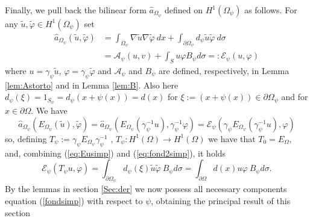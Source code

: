 \documentclass[a4paper,reqno,11pt,oneside]{amsart}
\theoremstyle{plain}
\theoremstyle{plain}
\theoremstyle{plain}
\theoremstyle{remark}
\begin{document}
Finally, we pull back the bilinear form $\hat a_{\Omega_\psi} $ defined  on $H^1 (\Omega_\psi)$ as follows. For any $\tilde u,\tilde \varphi\in H^1 (\Omega_\psi)$ set
$$
\begin{aligned}
    \hat a_{\Omega_\psi}(\tilde u,\tilde \varphi)&=
   \int_{ \Omega_\psi}\nabla \tilde u\nabla\tilde \varphi\  dx
    +\int_{\partial \Omega_\psi}d_\psi \tilde u\tilde \varphi\ d\sigma 
    \\ &
    =\mathcal{A}_\psi (u,v)
    +\int_{S} u \varphi B_\psi d\sigma =:\mathcal{E}_\psi (u,\varphi) 
\end{aligned}$$
 where $u=\gamma_{\psi}\tilde u$, $\varphi=\gamma_{\psi} \tilde \varphi$  and $\mathcal{A}_\psi$ and $B_\psi$ are defined, respectively, in Lemma \ref{lem:Astorto} and in Lemma \ref{lem:B}.   Also here $d_\psi(\xi)=1_{S_\psi}=d_\psi(x+\psi(x))=d(x)$ for $\xi:=(x+\psi(x))\in\partial\Omega_\psi$ and for $x\in \partial \Omega$.
We have
\begin{equation}\label{eq:fond2simp}
      \hat  a_{\Omega_\psi}(E_{\Omega_\psi}(\tilde u),\tilde \varphi)= 
     \hat   a_{\Omega_\psi}( E_{\Omega_\psi}(\gamma_\psi^{-1} u),\gamma_\psi^{-1}  \varphi)
=\mathcal{E}_\psi (\gamma_\psi E_{\Omega_\psi}(\gamma_\psi^{-1} u),\varphi)
\end{equation}
so, defining $T_\psi:= \gamma_\psi E_{\Omega_\psi}\gamma_\psi^{-1} $ , $T_\psi :H^1(\Omega)\rightarrow H^1(\Omega)$ we have that $T_0=E_\Omega $,  and, combining (\ref{eq:Eusimp}) and (\ref{eq:fond2simp}), it holds
\begin{equation}\label{fondsimp}
    \mathcal{E}_\psi (T_\psi u,\varphi)=\int_{\partial \Omega_\psi} d_\psi(\xi)\tilde u \tilde \varphi\ B_\psi d\sigma =\int_{\partial \Omega} d(x)u\varphi\ B_\psi d\sigma .
\end{equation} 
By the lemmas in section \ref{Sec:der} we now possess all necessary components  equation (\ref{fondsimp}) with respect to $\psi$, obtaining the principal result of this section
\end{document}
